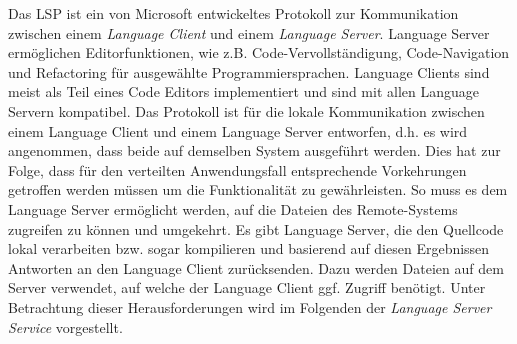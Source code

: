 Das \acl{LSP} ist ein von Microsoft \cite{noauthor_microsoft_nodate} entwickeltes Protokoll zur Kommunikation zwischen einem \textit{Language Client} und einem \textit{Language Server}. Language Server ermöglichen Editorfunktionen, wie z.B. Code-Vervollständigung, Code-Navigation und Refactoring für ausgewählte Programmiersprachen. Language Clients sind meist als Teil eines Code Editors implementiert und sind mit allen Language Servern kompatibel. Das Protokoll ist für die lokale Kommunikation zwischen einem Language Client und einem Language Server entworfen, d.h. es wird angenommen, dass beide auf demselben System ausgeführt werden. Dies hat zur Folge, dass für den verteilten Anwendungsfall entsprechende Vorkehrungen getroffen werden müssen um die Funktionalität zu gewährleisten. So muss es dem Language Server ermöglicht werden, auf die Dateien des Remote-Systems zugreifen zu können und umgekehrt. Es gibt Language Server, die den Quellcode lokal verarbeiten bzw. sogar kompilieren und basierend auf diesen Ergebnissen Antworten an den Language Client zurücksenden. Dazu werden Dateien auf dem Server verwendet, auf welche der Language Client ggf. Zugriff benötigt. Unter Betrachtung dieser Herausforderungen wird im Folgenden der \textit{Language Server Service} vorgestellt.

